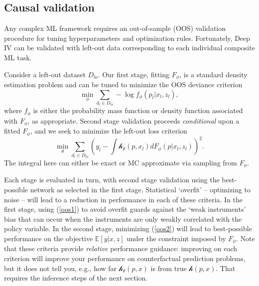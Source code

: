 \documentclass[12pt]{article}
\newcommand{\ds}[1]{\mathds{#1}}
\newcommand{\cf}{\ensuremath{\mathscr{h}}}
\newcommand{\price}{\ensuremath{p}}
\begin{document}


\subsection{Causal validation}

Any complex ML framework requires an out-of-sample (OOS) validation procedure for tuning hyperparameters and optimization rules.  Fortunately,  Deep IV  can be validated with left-out data corresponding to each individual composite ML task.

Consider a left-out dataset $D_{lo}$.
 Our first stage, fitting $F_\phi$, is a standard density estimation problem and can be tuned to minimize the OOS deviance criterion
\begin{equation}\label{oos1}
\min_\phi \sum_{d_l\in D_{lo}} -\log f_\phi(p_l | x_l, z_l),   
\end{equation}  
where $f_\phi$ is either the probability mass function or density function associated with $F_\phi$, as appropriate.  
Second stage validation proceeds {\it conditional} upon a fitted $F_\phi$, and we seek to minimize the left-out loss criterion
\begin{equation}\label{oos2}
\min_\theta \sum_{d_l\in D_{lo}} 
\left(y_l - \int \cf_\theta(\price, x_l)dF_\phi(\price|x_l,z_l)\right)^2.
\end{equation}
The integral here can either be exact or MC approximate via sampling from $F_\phi$.  

Each stage is evaluated in turn, with second stage validation using the best-possible network as selected in the first stage.  Statistical `overfit' -- optimizing to noise -- will lead to a reduction in performance in each of these criteria.  In the first stage, using (\ref{oos1}) to avoid overfit guards against the `weak instruments' bias \citep{bound1995problems} that can occur when the instruments are only weakly correlated with the policy variable.  In the second stage, minimizing (\ref{oos2}) will lead to best-possible performance on the objective $\ds{E}[y|x,z]$ under the constraint imposed by $F_\phi$.  
Note that these criteria provide {\it relative} performance guidance: improving on each criterion will improve your performance on counterfactual prediction problems, but it does not tell you, e.g., how far $\cf_\theta(\price,x)$ is from true $\cf(\price,x)$.  That requires the inference steps of the next section.
\end{document}
